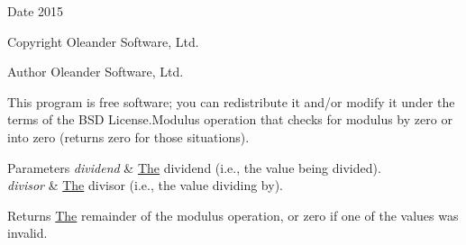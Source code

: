 \begin{DoxyDate}{Date}
2015 
\end{DoxyDate}
\begin{DoxyCopyright}{Copyright}
Oleander Software, Ltd. 
\end{DoxyCopyright}
\begin{DoxyAuthor}{Author}
Oleander Software, Ltd.
\end{DoxyAuthor}
This program is free software; you can redistribute it and/or modify it under the terms of the B\-S\-D License.\-Modulus operation that checks for modulus by zero or into zero (returns zero for those situations). 
\begin{DoxyParams}{Parameters}
{\em dividend} & \hyperlink{class_the}{The} dividend (i.\-e., the value being divided). \\
\hline
{\em divisor} & \hyperlink{class_the}{The} divisor (i.\-e., the value dividing by). \\
\hline
\end{DoxyParams}
\begin{DoxyReturn}{Returns}
\hyperlink{class_the}{The} remainder of the modulus operation, or zero if one of the values was invalid. 
\end{DoxyReturn}
